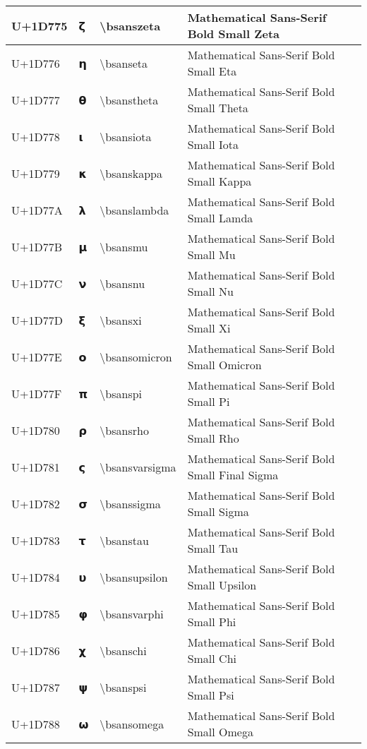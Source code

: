 \begin{table}[h]
\begin{tabulary}{\linewidth}{|L|L|L|L|}
\hline
U+1D775 & 𝝵 & {\textbackslash}bsanszeta & Mathematical Sans-Serif Bold Small Zeta \\
\hline
U+1D776 & 𝝶 & {\textbackslash}bsanseta & Mathematical Sans-Serif Bold Small Eta \\
\hline
U+1D777 & 𝝷 & {\textbackslash}bsanstheta & Mathematical Sans-Serif Bold Small Theta \\
\hline
U+1D778 & 𝝸 & {\textbackslash}bsansiota & Mathematical Sans-Serif Bold Small Iota \\
\hline
U+1D779 & 𝝹 & {\textbackslash}bsanskappa & Mathematical Sans-Serif Bold Small Kappa \\
\hline
U+1D77A & 𝝺 & {\textbackslash}bsanslambda & Mathematical Sans-Serif Bold Small Lamda \\
\hline
U+1D77B & 𝝻 & {\textbackslash}bsansmu & Mathematical Sans-Serif Bold Small Mu \\
\hline
U+1D77C & 𝝼 & {\textbackslash}bsansnu & Mathematical Sans-Serif Bold Small Nu \\
\hline
U+1D77D & 𝝽 & {\textbackslash}bsansxi & Mathematical Sans-Serif Bold Small Xi \\
\hline
U+1D77E & 𝝾 & {\textbackslash}bsansomicron & Mathematical Sans-Serif Bold Small Omicron \\
\hline
U+1D77F & 𝝿 & {\textbackslash}bsanspi & Mathematical Sans-Serif Bold Small Pi \\
\hline
U+1D780 & 𝞀 & {\textbackslash}bsansrho & Mathematical Sans-Serif Bold Small Rho \\
\hline
U+1D781 & 𝞁 & {\textbackslash}bsansvarsigma & Mathematical Sans-Serif Bold Small Final Sigma \\
\hline
U+1D782 & 𝞂 & {\textbackslash}bsanssigma & Mathematical Sans-Serif Bold Small Sigma \\
\hline
U+1D783 & 𝞃 & {\textbackslash}bsanstau & Mathematical Sans-Serif Bold Small Tau \\
\hline
U+1D784 & 𝞄 & {\textbackslash}bsansupsilon & Mathematical Sans-Serif Bold Small Upsilon \\
\hline
U+1D785 & 𝞅 & {\textbackslash}bsansvarphi & Mathematical Sans-Serif Bold Small Phi \\
\hline
U+1D786 & 𝞆 & {\textbackslash}bsanschi & Mathematical Sans-Serif Bold Small Chi \\
\hline
U+1D787 & 𝞇 & {\textbackslash}bsanspsi & Mathematical Sans-Serif Bold Small Psi \\
\hline
U+1D788 & 𝞈 & {\textbackslash}bsansomega & Mathematical Sans-Serif Bold Small Omega \\

\end{tabulary}
\end{table}
